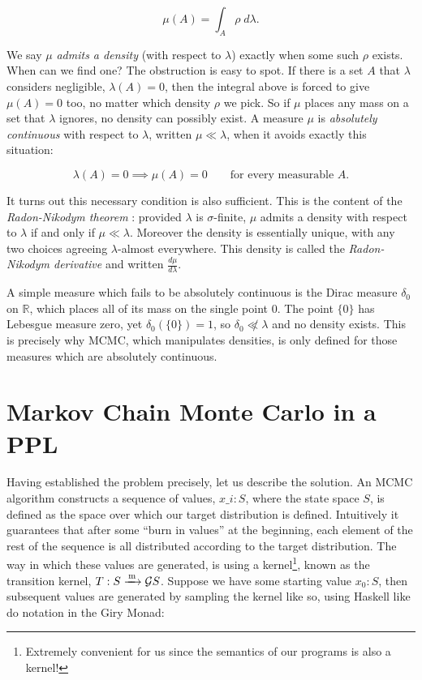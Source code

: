 \[
\mu(A) = \int_A \rho \; d\lambda.
\]

We say $\mu$ \emph{admits a density} (with respect to $\lambda$) exactly when some such $\rho$ exists. When can we find one? The obstruction is easy to spot. If there
is a set $A$ that $\lambda$ considers negligible, $\lambda(A) = 0$, then the integral above is forced to give $\mu(A) = 0$ too, no matter which density $\rho$ we pick. So
if $\mu$ places any mass on a set that $\lambda$ ignores, no density can possibly exist. A measure $\mu$ is \emph{absolutely continuous} with respect to $\lambda$, written
$\mu \ll \lambda$, when it avoids exactly this situation:

\[
\lambda(A) = 0 \implies \mu(A) = 0 \qquad \text{for every measurable } A.
\]

It turns out this necessary condition is also sufficient. This is the content of the \emph{Radon-Nikodym theorem} \citep{axler}: provided $\lambda$ is $\sigma$-finite, $\mu$
admits a density with respect to $\lambda$ if and only if $\mu \ll \lambda$. Moreover the density is essentially unique, with any two choices agreeing $\lambda$-almost
everywhere. This density is called the \emph{Radon-Nikodym derivative} and written $\frac{d\mu}{d\lambda}$.

A simple measure which fails to be absolutely continuous is the Dirac measure $\delta_0$ on $\mathbb{R}$, which places all of its mass on the single point $0$. The point
$\{0\}$ has Lebesgue measure zero, yet $\delta_0(\{0\}) = 1$, so $\delta_0 \not\ll \lambda$ and no density exists. This is precisely why MCMC, which manipulates densities,
is only defined for those measures which are absolutely continuous.

\section{Markov Chain Monte Carlo in a PPL}
Having established the problem precisely, let us describe the solution.
An MCMC algorithm constructs a sequence of values, $x\_i : S$, where the state space $S$, is defined as the space over which our target distribution is defined. Intuitively it guarantees that after some
``burn in values'' at the beginning, each element of the rest of the sequence is all distributed according to the target distribution. 
The way in which these values are generated, is using a kernel\footnote{Extremely convenient for us since the semantics of our programs is also a kernel!}, known as the transition kernel, $T : S \xrightarrow{\,\mathrm{m}\,} \mathcal{G} S$.
Suppose we have some starting value $x_0 : S$, then subsequent values are generated by sampling the kernel like so, using Haskell like do notation in the Giry Monad:

